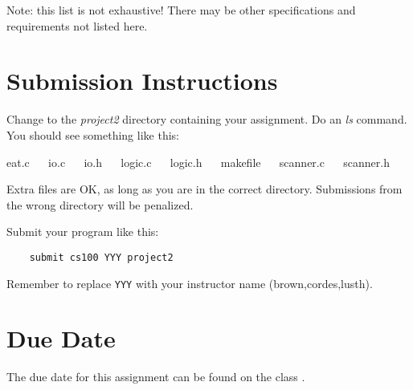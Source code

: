 \documentclass[12pt]{article}
\begin{document}
Note: this list is not exhaustive! There may be other specifications
and requirements not listed here.

\section*{Submission Instructions}

Change to the {\it project2} directory containing your assignment.  Do an
{\it ls} command. You should see something like this:

{\color{red} eat.c ~~ io.c ~~ io.h ~~ logic.c ~~ logic.h ~~ makefile ~~ scanner.c ~~ scanner.h }

Extra files are OK, as long as you are in the correct directory. 
Submissions from the wrong directory
will be penalized.

Submit your program like this:

\begin{verbatim}
    submit cs100 YYY project2
\end{verbatim}

Remember to replace \verb!YYY! with your instructor name
(brown,cordes,lusth).

\section*{Due Date}

The due date for this assignment can be found on the class
.
\end{document}
